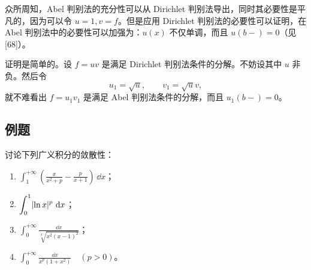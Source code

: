 众所周知，Abel 判别法的充分性可以从 Dirichlet 判别法导出，同时其必要性是平凡的，因为可以令 $u=1,v=f$。但是应用 Dirichlet 判别法的必要性可以证明，在 Abel 判别法中的必要性可以加强为：$u(x)$ 不仅单调，而且 $u(b-)=0$（见 [68]）。

证明是简单的。设 $f=uv$ 是满足 Dirichlet 判别法条件的分解。不妨设其中 $u$ 非负。然后令
\[
  u_1=\sqrt{u},\qquad v_1=\sqrt{u}v,
\]
就不难看出 $f=u_1v_1$ 是满足 Abel 判别法条件的分解，而且 $u_1(b-)=0$。

\subsection{例题}

\begin{xexample}[12.2.2]
讨论下列广义积分的敛散性：
\begin{enumerate}[label=(\arabic*)]
  \item $\displaystyle\int_1^{+\infty}\left(\frac{x}{x^2+p}-\frac{p}{x+1}\right)\,\dd x$；
  \item $\displaystyle\int_0^1\lvert\ln x\rvert^p\,\mathop{}\!\mathrm{d} x$；
  \item $\displaystyle\int_0^{+\infty}\frac{\dd x}{\sqrt[3]{x^2(x-1)^2}}$；
  \item $\displaystyle\int_0^{+\infty}\frac{\dd x}{x^p(1+x^2)}\quad(p>0)$。
\end{enumerate}
\end{xexample}
